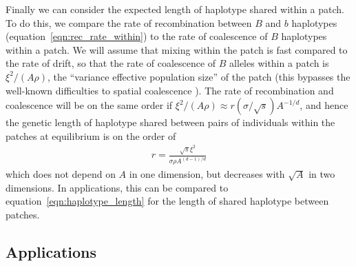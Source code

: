 \documentclass{article}
\begin{document}
 
Finally we can consider the expected length of haplotype shared within a patch. 
To do this, we compare the rate of recombination between $B$ and $b$ haplotypes (equation~\ref{eqn:rec_rate_within})
to the rate of coalescence of $B$ haplotypes within a patch. 
We will assume that mixing within the patch is fast compared to the rate of drift, 
so that the rate of coalescence of $B$ alleles within a patch is 
$\xi^2/(A\rho)$,
the ``variance effective population size'' of the patch
(this bypasses the well-known difficulties to spatial coalescence \citep{felsenstein1975pain,barton2002neutral}).
The rate of recombination and coalescence will be on the same order if
$\xi^2 /(A\rho) \approx r (\sigma/\sqrt{s}) A^{-1/d}$, 
and hence the genetic length of haplotype shared between pairs of
individuals within the patches at equilibrium is on the order of
\begin{align} \label{eqn:within_haplotype_length} 
  r = \frac{\sqrt{s} \xi^2}{\sigma \rho A^{(d-1)/d}} 
\end{align}
which does not depend on $A$ in one dimension,
but decreases with $\sqrt{A}$ in two dimensions.
In applications, this can be compared to equation~\eqref{eqn:haplotype_length}
for the length of shared haplotype between patches.

\subsection{Applications} 
\label{ss:applications}
\end{document}
